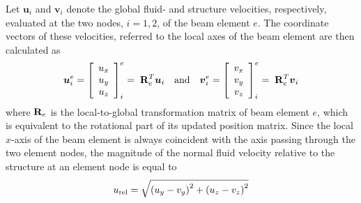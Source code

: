 Let $\bm{u}_i$ and $\bm{v}_i$ denote the global fluid- and structure velocities,
respectively, evaluated at the two nodes, $i=1,2$, of the beam element $e$.
The coordinate vectors of these velocities, referred to the local axes of the
beam element are then calculated as
%
\begin{equation}
\mbox{\boldmath $u$}_i^e =
\left[\begin{array}{c} u_x \\ u_y \\ u_z \end{array}\right]^e_i =\;
{\bf R}_e^T\mbox{\boldmath $u$}_i
\quad\mbox{and}\quad
\mbox{\boldmath $v$}_i^e =
\left[\begin{array}{c} v_x \\ v_y \\ v_z \end{array}\right]^e_i =\;
{\bf R}_e^T\mbox{\boldmath $v$}_i
\end{equation}
%
where ${\bf R}_e$ is the local-to-global transformation matrix of beam element
$e$, which is equivalent to the rotational part of its updated position matrix.
Since the local $x$-axis of the beam element is always coincident with the axis
passing through the two element nodes, the magnitude of the normal fluid
velocity relative to the structure at an element node is equal to
%
\begin{equation}
\label{eq:u_rel}
u_{\rm rel} = \sqrt{\left(u_y-v_y\right)^2 + \left(u_z-v_z\right)^2}
\end{equation}

